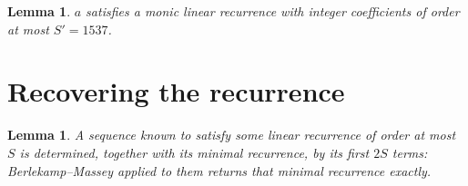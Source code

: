 \documentclass[11pt,a4paper]{article}
\theoremstyle{plain}
\newtheorem{lemma}[theorem]{Lemma}
\theoremstyle{definition}
\begin{document}
\begin{lemma}\label{lem:cf}
$a$ satisfies a monic linear recurrence with integer coefficients of order at most
$S'=1537$.
\end{lemma}

\section{Recovering the recurrence}

\begin{lemma}\label{lem:bm}
A sequence known to satisfy some linear recurrence of order at most $S$ is determined, together
with its minimal recurrence, by its first $2S$ terms: Berlekamp--Massey applied to them returns
that minimal recurrence exactly.
\end{lemma}
\end{document}
